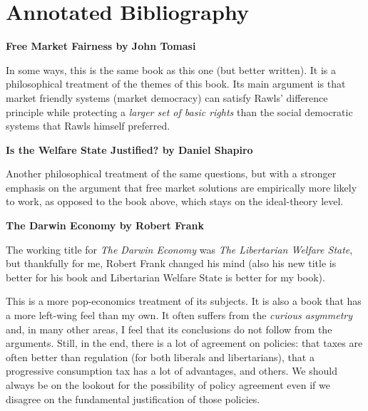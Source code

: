 \def\book#1{\bigskip\textbf{#1}\par}%
\chapter{Annotated Bibliography}

\book{Free Market Fairness by John Tomasi}

In some ways, this is the same book as this one (but better written). It is a
philosophical treatment of the themes of this book. Its main argument is that
market friendly systems (market democracy) can satisfy Rawls' difference
principle while protecting a \emph{larger set of basic rights} than the social
democratic systems that Rawls himself preferred.

\book{Is the Welfare State Justified? by Daniel Shapiro}

Another philosophical treatment of the same questions, but with a stronger
emphasis on the argument that free market solutions are empirically more likely
to work, as opposed to the book above, which stays on the ideal-theory level.

\book{The Darwin Economy by Robert Frank}

The working title for \emph{The Darwin Economy} was \emph{The Libertarian
Welfare State}, but thankfully for me, Robert Frank changed his mind (also his
new title is better for his book and Libertarian Welfare State is better for my
book).

This is a more pop-economics treatment of its subjects. It is also a book that
has a more left-wing feel than my own. It often suffers from the \emph{curious
asymmetry} and, in many other areas, I feel that its conclusions do not follow
from the arguments. Still, in the end, there is a lot of agreement on policies:
that taxes are often better than regulation (for both liberals and
libertarians), that a progressive consumption tax has a lot of advantages, and
others. We should always be on the lookout for the possibility of policy
agreement even if we disagree on the fundamental justification of those
policies.

